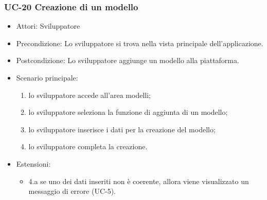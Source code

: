 	\subsubsection{UC-20 Creazione di un modello}
		\begin{itemize}
			\item Attori: Sviluppatore
			\item Precondizione: Lo sviluppatore si trova nella vista principale dell'applicazione.
			\item Postcondizione: Lo sviluppatore aggiunge un modello alla piattaforma.
			\item Scenario principale:
			\begin{enumerate}
				\item lo sviluppatore accede all'area modelli;
				\item lo sviluppatore seleziona la funzione di aggiunta di un modello;
				\item lo sviluppatore inserisce i dati per la creazione del modello;
				\item lo sviluppatore completa la creazione.
			\end{enumerate}
			\item Estensioni:
				\begin{itemize}
					\item 4.a se uno dei dati inseriti non è coerente, allora viene visualizzato un messaggio di errore (UC-5).
				\end{itemize}
		\end{itemize}